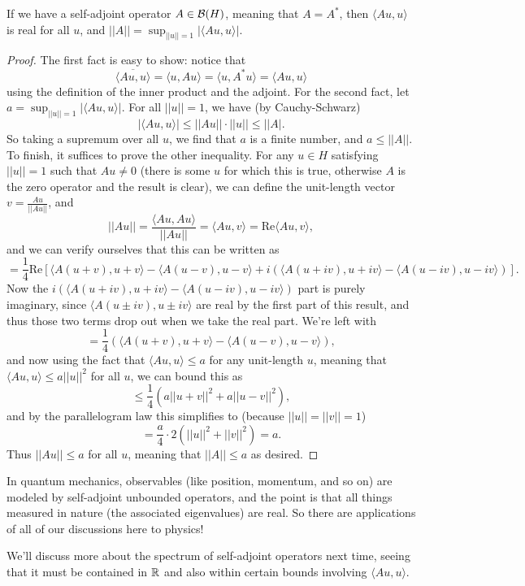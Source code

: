 \begin{theorem}
If we have a self-adjoint operator $A \in \mathcal{B}(H)$, meaning that $A = A^\ast$, then $\langle Au, u \rangle$ is real for all $u$, and $||A|| = \sup_{||u|| = 1} |\langle Au, u \rangle|$.
\end{theorem}
\begin{proof}
The first fact is easy to show: notice that
\[
    \overline{\langle Au, u \rangle} = \langle u, Au \rangle = \langle u, A^\ast u \rangle = \langle Au, u \rangle
\]
using the definition of the inner product and the adjoint. For the second fact, let $a = \sup_{||u|| = 1} |\langle Au, u \rangle|$. For all $||u|| = 1$, we have (by Cauchy-Schwarz)
\[
    |\langle Au, u \rangle| \le ||Au|| \cdot ||u|| \le ||A|.
\]
So taking a supremum over all $u$, we find that $a$ is a finite number, and $a \le ||A||$. To finish, it suffices to prove the other inequality. For any $u \in H$ satisfying $||u|| = 1$ such that $Au \ne 0$ (there is some $u$ for which this is true, otherwise $A$ is the zero operator and the result is clear), we can define the unit-length vector $v = \frac{Au}{||Au||}$, and 
\[
    ||Au|| = \frac{\langle Au, Au \rangle}{||Au||} = \langle Au, v \rangle = \text{Re}\langle Au, v \rangle, 
\]
and we can verify ourselves that this can be written as 
\[
    = \frac{1}{4} \text{Re}\left[ \langle A(u+v), u+v \rangle - \langle A(u-v), u-v\rangle + i\left(\langle A(u+iv), u+iv \rangle - \langle A(u-iv), u-iv \rangle\right)\right].
\]
Now the $i\left(\langle A(u+iv), u+iv \rangle - \langle A(u-iv), u-iv \rangle\right)$ part is purely imaginary, since $\langle A(u\pm iv), u\pm iv \rangle$ are real by the first part of this result, and thus those two terms drop out when we take the real part. We're left with 
\[
    = \frac{1}{4} \left(\langle A(u+v), u+v \rangle - \langle A(u-v), u-v \rangle \right),
\]
and now using the fact that $\langle Au, u \rangle \le a$ for any unit-length $u$, meaning that $\langle Au, u \rangle \le a ||u||^2$ for all $u$, we can bound this as
\[
    \le \frac{1}{4} (a||u+v||^2 + a||u-v||^2),
\]
and by the parallelogram law this simplifies to (because $||u|| = ||v|| = 1$)
\[
    = \frac{a}{4} \cdot 2 (||u||^2 + ||v||^2) = a.
\]
Thus $||Au|| \le a$ for all $u$, meaning that $||A|| \le a$ as desired.
\end{proof}

\begin{remark}
In quantum mechanics, observables (like position, momentum, and so on) are modeled by self-adjoint unbounded operators, and the point is that all things measured in nature (the associated eigenvalues) are real. So there are applications of all of our discussions here to physics!
\end{remark}

We'll discuss more about the spectrum of self-adjoint operators next time, seeing that it must be contained in $\mathbb R$ and also within certain bounds involving $\langle Au, u \rangle$. 